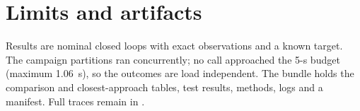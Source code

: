 \documentclass[11pt]{article}
\begin{document}
\section{Limits and artifacts}
Results are nominal closed loops with exact observations and a known target.
The campaign partitions ran concurrently; no call approached the 5-s budget
(maximum 1.06~s), so the outcomes are load independent. The bundle
 holds the comparison and
closest-approach tables, test results, methods, logs and a manifest. Full
traces remain in .
\end{document}
